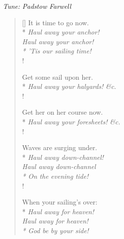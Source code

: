 \documentclass[MAIN]{subfiles}
\begin{document}
\begin{center}
\emph{Tune: Padstow Farwell}
\end{center}

\bigskip

\settowidth{\versewidth}{It is time to go now.}
\begin{verse}[\versewidth]
It is time to go now.\\*
{\it Haul away your anchor!\\
Haul away your anchor!\\*
'Tis our sailing time!}\\!

Get some sail upon her.\\*
{\it Haul away your halyards! \&c.}\\!

Get her on her course now.\\*
{\it Haul away your foresheets! \&c.}\\!

Waves are surging under.\\*
{\it Haul away down-channel!\\
Haul away down-channel\\*
On the evening tide!}\\!

When your sailing's over:\\*
{\it Haul away for heaven!\\
Haul away for heaven!\\*
God be by your side!}
\end{verse}
\end{document}
